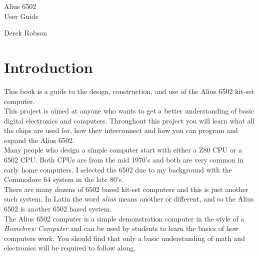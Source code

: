 \documentclass{ol-softwaremanual}
\def\blankpage{%
      \clearpage%
      \thispagestyle{empty}%
      \addtocounter{page}{-1}%
      \null%
      \clearpage}
\begin{document}
\afterpage{\restoregeometry}
\pagecolor{PCBGreen}\afterpage{\nopagecolor}

\thispagestyle{empty}
\begin{flushright}
{\fontsize{86}{88}\selectfont
Alius 6502\\}
{\fontsize{26}{28}\selectfont
User Guide}
\end{flushright}
\vfill
\begin{flushright}
Derek Robson
\end{flushright}
\begin{center}
\end{center}
\clearpage
\restoregeometry
\blankpage

\setcounter{tocdepth}{2}
\tableofcontents
\clearpage


\section{Introduction}

This book is a guide to the design, construction, and use of the Alius 6502 kit-set computer.\\

This project is aimed at anyone who wants to get a better understanding of basic digital electronics and computers. Throughout this project you will learn what all the chips are used for, how they interconnect and how you can program and expand the Alius 6502.\\ 

Many people who design a simple computer start with either a Z80 CPU or a 6502 CPU. Both CPUs are from the mid 1970's and both are very common in early home computers. I selected the 6502 due to my background with the Commodore 64 system in the late 80's.\\

There are many dozens of 6502 based kit-set computers and this is just another such system. In Latin the word \emph{alius} means another or different, and so the Alius 6502 is another 6502 based system.\\

The Alius 6502 computer is a simple demonstration computer in the style of a \emph{Homebrew Computer} and can be used by students to learn the basics of how computers work. You should find that only a basic understanding of math and electronics will be required to follow along.\\
\end{document}
